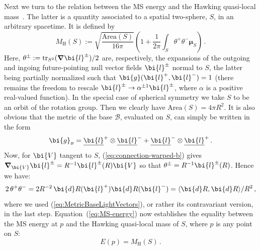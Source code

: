 \documentclass
[rmp,aps,twocolumn,showpacs,preprintnumbers,amsmath,amssymb]{revtex4}
\theoremstyle{plain}
\theoremstyle{definition}
\theoremstyle{remark}
\newcommand{\ul}[1]{\underline{#1}}
\newcommand{\sss}{\scriptscriptstyle}
\newcommand{\ind}[1]{{\sss \text{#1}}}        %
\newcommand{\tr}{\mathrm{tr}}                 %
\newcommand{\sprod}[2]{\langle#1,#2\rangle}   %
\newcommand{\bnabla}{\boldsymbol{\nabla}}     %
\newcommand{\ed}{\bi{d}}                      %
\newcommand{\B}{\mathcal{B}}                      %
\newcommand{\Stwo}{{S^2}}                         %
\newcommand{\sB}{{\sss \B}}                       %
\newcommand{\gB}{\g_\sB}                          %
\newcommand{\g}{\bg}                            %
\newcommand{\bd}{\bi{d}}
\newcommand{\bg}{\bi{g}}
\newcommand{\bl}{\bi{l}}
\newcommand{\bV}{\bi{V}}
\newcommand{\bmu}{\boldsymbol{\mu}}
\begin{document}
Next we turn to the relation between the MS energy and the Hawking 
quasi-local mass~\cite{Hawking:1968}. The latter is a quantity 
associated to a spatial two-sphere, $S$, in an arbitrary spacetime.
It is defined by
%
\begin{equation}\label{eq:Hawking-mass}
  M_\ind{H}(S) := \sqrt{\frac{\textrm{Area}(S)}{16\pi}}
  \left( 1 + \frac{1}{2\pi}\int_S \theta^+\theta^-\bmu_{S} \right) \,.
\end{equation}
%
Here, $\theta^\pm:=\tr_\Stwo(\bnabla\bl^\pm)/2$ are, respectively, 
the expansions of the outgoing and ingoing future-pointing null 
vector fields $\bl^\pm$ normal to $S$, the latter being 
partially normalized such that $\g(\bl^+,\bl^-)=1$ (there remains
the freedom to rescale $\bl^\pm\rightarrow\alpha^{\pm 1}\bl^\pm$,
where $\alpha$ is a positive real-valued function). In the special case of 
spherical symmetry we take $S$ to be an orbit of the rotation 
group. Then we clearly have $\textrm{Area}(S)=4\pi R^2$. It is also 
obvious that the metric of the base $\B$, evaluated on $S$, can 
simply be written in the form 
%
\begin{equation}\label{eq:MetricBaseLightVectors}
  \gB = \ul\bl^+\otimes\ul\bl^- + \ul\bl^-\otimes\ul\bl^+\,.
\end{equation}  
%
Now, for $\bV$ tangent to $S$, (\ref{eq:connection-warped-b}) 
gives $\bnabla_\bV\bl^\pm=R^{-1}\bl^\pm(R)\bV$ so that 
$\theta^\pm=R^{-1}\bl^\pm(R)$. Hence we have: 
%
\begin{equation}\label{eq:expansions-product}
  2\,\theta^+\theta^- 
  = 2R^{-2}\,\bd R(\bl^+)\bd R(\bl^-)
  = \sprod{\ed R}{\ed R}/R^2 \,,
\end{equation}
%
where we used (\ref{eq:MetricBaseLightVectors}), or rather its 
contravariant version, in the last step. Equation~(\ref{eq:MS-energy}) 
now establishes the equality between the MS energy at $p$ and the 
Hawking quasi-local mass of $S$, where $p$ is any point on $S$: 
%
\begin{equation}\label{eq:MSE-Hawking-ql-mass}
  E(p) = M_\ind{H}(S)\,.
\end{equation}
%
\end{document}
